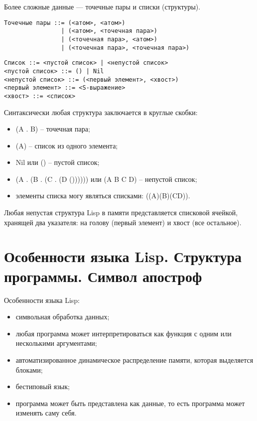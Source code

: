 Более сложные данные --- точечные пары и списки (структуры).

\vspace{4mm}
\begin{minipage}{0.92\linewidth}
\begin{lstlisting}
Точечные пары ::= (<атом>, <атом>) 
                | (<атом>, <точечная пара>)
                | (<точечная пара>, <атом>)
                | (<точечная пара>, <точечная пара>)
\end{lstlisting}
\end{minipage}

\vspace{4mm}
\begin{minipage}{0.92\linewidth}
\begin{lstlisting}
Список ::= <пустой список> | <непустой список>
<пустой список> ::= () | Nil
<непустой список> ::= (<первый элемент>, <хвост>)
<первый элемент> ::= <S-выражение>
<хвост> ::= <список>
\end{lstlisting}
\end{minipage}

Синтаксически любая структура заключается в круглые скобки:
\begin{itemize}
    \item (A . B) -- точечная пара;
    \item (A) -- список из одного элемента;
    \item Nil или () -- пустой список;
    \item (A . (B . (C . (D ()))))) или (A B C D) -- непустой список;
    \item элементы списка могу являться списками: ((A)(B)(CD)).
\end{itemize}

Любая непустая структура Lisp в памяти представляется списковой ячейкой,
хранящей два указателя: на голову (первый элемент) и хвост (все остальное).

\section{Особенности языка Lisp. Структура программы. Символ апостроф}

Особенности языка Lisp:
\begin{itemize}
    \item символьная обработка данных;
    \item любая программа может интерпретироваться как функция с
        одним или несколькими аргументами;
    \item автоматизированное динамическое распределение памяти, которая
        выделяется блоками;
    \item бестиповый язык;
    \item программа может быть представлена как данные, то есть программа
        может изменять саму себя.
\end{itemize}

